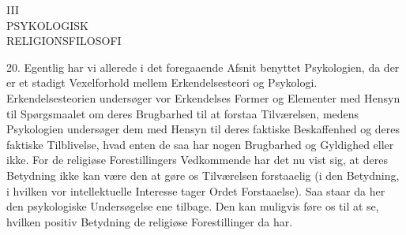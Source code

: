 \documentclass[12pt,a4paper,openany]{book}
\newcommand{\opage}[1]{\marginnote{\footnotesize\textit{[#1]}}}
\begin{document}
\clearpage

\opage{51}\begin{center}III\\[6pt]PSYKOLOGISK\\ RELIGIONSFILOSOFI\end{center}
\clearpage
\opage{52}\mbox{}\clearpage

\opage{53}20. Egentlig har vi allerede i det foregaaende Afsnit benyttet
Psykologien, da der er et stadigt Vexelforhold mellem Erkendelsesteori
og Psykologi. Erkendelsesteorien undersøger vor Erkendelses Former og
Elementer med Hensyn til Spørgsmaalet om deres Brugbarhed til at forstaa
Tilværelsen, medens Psykologien undersøger dem med Hensyn til deres
faktiske Beskaffenhed og deres faktiske Tilblivelse, hvad enten de saa
har nogen Brugbarhed og Gyldighed eller ikke. For de religiøse
Forestillingers Vedkommende har det nu vist sig, at deres Betydning ikke
kan være den at gøre os Tilværelsen forstaaelig (i den Betydning, i
hvilken vor intellektuelle Interesse tager Ordet Forstaaelse). Saa staar
da her den psykologiske Undersøgelse ene tilbage. Den kan muligvis føre
os til at se, hvilken positiv Betydning de religiøse Forestillinger da
har.
\end{document}
